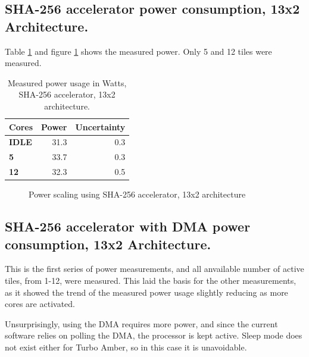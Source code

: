 \begin{appendix}
\subsection{SHA-256 accelerator power consumption, 13x2 Architecture.}

Table \ref{tab:SHA-power2} and figure \ref{fig:SHA-power2} shows the measured power.
Only 5 and 12 tiles were measured.

\begin{table}
\begin{tabular}{| l | r | r |}
  \hline 
  \textbf{Cores} & \textbf{Power} & \textbf{Uncertainty} \\
  \hline                       
  \textbf{IDLE} &  31.3 & 0.3 \\
  \textbf{5} &  33.7 & 0.3\\
  \textbf{12} &  32.3 & 0.5 \\
  \hline 
\end{tabular}
\caption{Measured power usage in Watts, SHA-256 accelerator, 13x2 architecture.}
\label{tab:SHA-power2}
\end{table}


\begin{figure}
	\caption{Power scaling using SHA-256 accelerator, 13x2 architecture}
	\label{fig:SHA-power2}
\end{figure}

\subsection{SHA-256 accelerator with DMA power consumption, 13x2 Architecture.}

This is the first series of power measurements, and all anvailable number of active tiles, from 1-12, were measured.
This laid the basis for the other measurements, as it showed the trend of the measured power usage slightly reducing as more cores are activated.
 
Unsurprisingly, using the DMA requires more power, and since the current software relies on polling the DMA, the processor is kept active.
Sleep mode does not  exist either for Turbo Amber, so in this case it is unavoidable.


\end{appendix}
